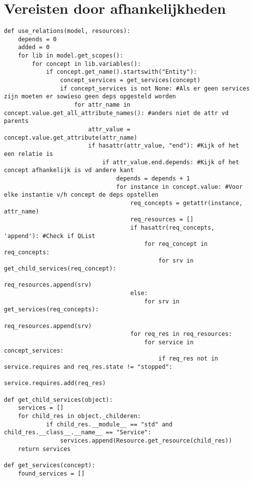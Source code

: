 \section{Vereisten door afhankelijkheden}
\begin{minipage}{\textwidth}
\begin{lstlisting}
def use_relations(model, resources):
    depends = 0
    added = 0
    for lib in model.get_scopes():
        for concept in lib.variables():
            if concept.get_name().startswith("Entity"):
                concept_services = get_services(concept)
                if concept_services is not None: #Als er geen services zijn moeten er sowieso geen deps opgesteld worden
                    for attr_name in concept.value.get_all_attribute_names(): #anders niet de attr vd parents
                        attr_value = concept.value.get_attribute(attr_name)
                        if hasattr(attr_value, "end"): #Kijk of het een relatie is
                            if attr_value.end.depends: #Kijk of het concept afhankelijk is vd andere kant
                                depends = depends + 1
                                for instance in concept.value: #Voor elke instantie v/h concept de deps opstellen
                                    req_concepts = getattr(instance, attr_name)
                                    req_resources = []
                                    if hasattr(req_concepts, 'append'): #Check if QList
                                        for req_concept in req_concepts:
                                            for srv in get_child_services(req_concept):
                                                req_resources.append(srv)
                                    else:
                                        for srv in get_services(req_concepts):
                                                req_resources.append(srv)
                                    for req_res in req_resources:
                                        for service in concept_services:
                                            if req_res not in service.requires and req_res.state != "stopped":
                                                service.requires.add(req_res)

def get_child_services(object):
    services = []
    for child_res in object._childeren:
            if child_res.__module__ == "std" and child_res.__class__.__name__ == "Service":
                services.append(Resource.get_resource(child_res))
    return services
 
def get_services(concept):
    found_services = []
    

\end{lstlisting}
\end{minipage}
